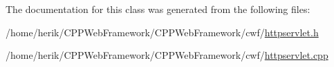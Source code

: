 The documentation for this class was generated from the following files\+:\begin{DoxyCompactItemize}
\item 
/home/herik/\+C\+P\+P\+Web\+Framework/\+C\+P\+P\+Web\+Framework/cwf/\hyperlink{httpservlet_8h}{httpservlet.\+h}\item 
/home/herik/\+C\+P\+P\+Web\+Framework/\+C\+P\+P\+Web\+Framework/cwf/\hyperlink{httpservlet_8cpp}{httpservlet.\+cpp}\end{DoxyCompactItemize}
